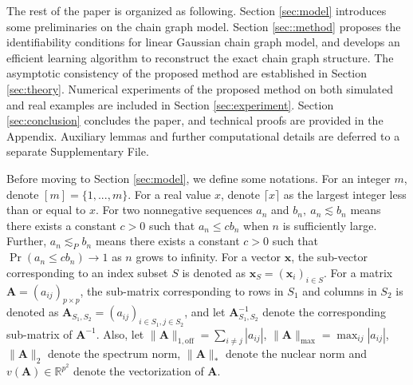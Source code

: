 \documentclass[12pt]{article}
\newcommand{\xc}[1]{\textcolor{blue}{#1}}
\newcommand{\A}{\mathbf A}
\newcommand{\R}{\mathbb R}
\newcommand{\xx}{\mathbf x}
\newcommand{\1}{\uppercase\expandafter{\romannumeral1}}
\newcommand{\2}{\uppercase\expandafter{\romannumeral2}}
\newcommand{\0}{\textbf{0}}
\begin{document}
The rest of the paper is organized as following. Section \ref{sec:model} introduces some preliminaries on the chain graph model. Section \ref{sec::method} proposes the identifiability conditions for linear Gaussian chain graph model, and develops an efficient learning algorithm to reconstruct the exact chain graph structure. The asymptotic consistency of the proposed method are established in Section \ref{sec:theory}. Numerical experiments of the proposed method on both simulated and real examples are included in Section \ref{sec:experiment}. Section \ref{sec:conclusion} concludes the paper, and technical proofs are provided in the Appendix. Auxiliary lemmas and further computational details are deferred to a separate Supplementary File.

Before moving to Section \ref{sec:model}, we define some notations. For an integer $m$, denote $[m] = \{1,...,m\}$.
For a real value $x$, denote $\lceil x\rceil$ as the largest integer less than or equal to $x$.
For two nonnegative sequences $a_n$ and $b_n,~a_n\lesssim b_n$ means there exists a constant $c>0$ such that $a_n\leq cb_n$ when $n$ is sufficiently large. Further, $a_n\lesssim_P b_n$ means there exists a constant $c>0$ such that $\Pr(a_n\leq cb_n) \to 1$ as $n$ grows to infinity. 
For a vector $\xx$, the sub-vector corresponding to an index subset $S$ is denoted as $\xx_S=(\xx_i)_{i\in S}$. For a matrix $\mathbf{A}=(a_{ij})_{p\times p}$, the sub-matrix corresponding to rows in $S_1$ and columns in $S_2$ is denoted as $\mathbf{A}_{S_1,S_2}=(a_{ij})_{i\in S_1,j\in S_2}$, and let $\mathbf{A}_{S_1,S_2}^{-1}$ denote the corresponding sub-matrix of $\A^{-1}.$  
Also, let $\|\mathbf{A}\|_{1,\text{off}}=\sum_{i\neq j} |a_{ij}|$, $\|\A\|_{\max} = \max_{ij} |a_{ij}|$, $\|\mathbf{A}\|_2$ denote the spectrum norm, $\|\mathbf{A} \|_*$ denote the nuclear norm and $v(\A)\in\R^{p^2}$ denote the vectorization of $\A$.




\end{document}
